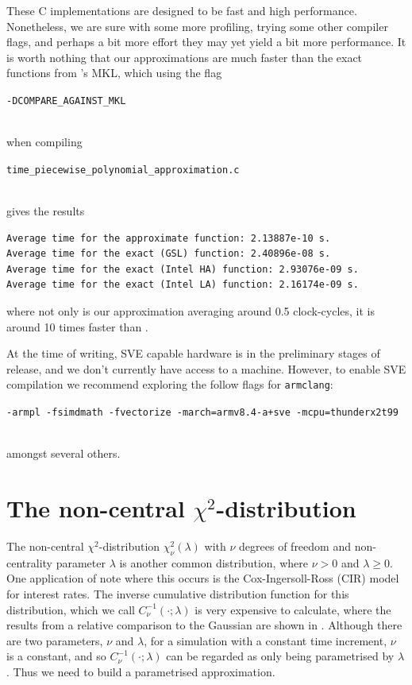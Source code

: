 \documentclass[11pt,a4paper,twoside,english]{extarticle}
\newcommand{\singlecodeline}[1]{\\[1em]\centerline{\lstinline[basicstyle=\ttfamily]$#1$}\\[1em]}
\begin{document}
These C implementations are designed to be fast and high performance. Nonetheless, we are sure with some more profiling, trying some other compiler flags, and perhaps a bit more effort they may yet yield a bit more performance. It is worth nothing that our approximations are much faster than the exact functions from \intel's MKL, which using the flag \singlecodeline{-DCOMPARE_AGAINST_MKL} when compiling \singlecodeline{time_piecewise_polynomial_approximation.c}
gives the results
\begin{verbatim}
Average time for the approximate function: 2.13887e-10 s.
Average time for the exact (GSL) function: 2.40896e-08 s.
Average time for the exact (Intel HA) function: 2.93076e-09 s.
Average time for the exact (Intel LA) function: 2.16174e-09 s.
\end{verbatim}
where not only is our approximation averaging around 0.5 clock-cycles, it is around 10 times faster than \intel. 

At the time of writing, SVE capable hardware is in the preliminary stages of release, and we don't currently have access to a machine. However, to enable SVE compilation we recommend exploring the follow flags for \verb|armclang|: \singlecodeline{-armpl -fsimdmath -fvectorize -march=armv8.4-a+sve -mcpu=thunderx2t99}
amongst several others. 

\clearpage
\section{The non-central $ \chi^2 $-distribution}

The non-central $ \chi^2 $-distribution $ \chi^2_\nu(\lambda) $ with $ \nu $ degrees of freedom and non-centrality parameter $ \lambda $ is another common distribution, where $ \nu > 0 $ and $ \lambda \geq 0 $. One application of note where this occurs is the Cox-Ingersoll-Ross (CIR) model for interest rates. The inverse cumulative distribution function for this distribution, which we call $ C^{-1}_{\nu}(\cdot;\lambda) $ is very expensive to calculate, where the results from a relative comparison to the Gaussian are shown in . Although there are two parameters, $ \nu $ and $ \lambda $, for a simulation with a constant time increment, $ \nu $ is a constant, and so $ C^{-1}_{\nu}(\cdot;\lambda) $ can be regarded as only being parametrised by $ \lambda $. Thus we need to build a parametrised approximation. 
\end{document}

